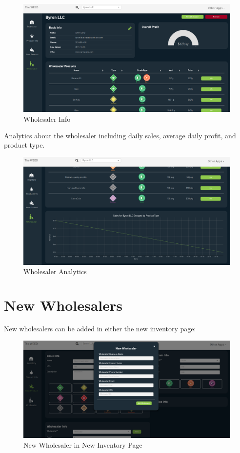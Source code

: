 \documentclass[]{book}
\theoremstyle{definition}
\theoremstyle{definition}
\theoremstyle{definition}
\theoremstyle{remark}
\begin{document}
\begin{figure}
\centering
\includegraphics{images/wholesaler.png}
\caption{Wholesaler Info}
\end{figure}

Analytics about the wholesaler including daily sales, average daily
profit, and product type.

\begin{figure}
\centering
\includegraphics{images/wholesaler2.png}
\caption{Wholesaler Analytics}
\end{figure}

\section{New Wholesalers}\label{new-wholesalers}

New wholesalers can be added in either the new inventory page:

\begin{figure}
\centering
\includegraphics{images/newWholesaler.png}
\caption{New Wholesaler in New Inventory Page}
\end{figure}
\end{document}

